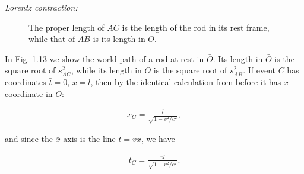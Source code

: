 \documentclass[12pt]{book}
\begin{document}
        \textit{Lorentz contraction:}
        \begin{figure}[h!]
        \centering
        \caption{The proper length of \( AC \) is the length of the rod in its rest frame, while that of \( AB \) is its length in \( O \).}
        \end{figure}

        In Fig. 1.13 we show the world path of a rod at rest in \( \bar{O} \). Its length in \( \bar{O} \) is the square root of \( s^2_{AC} \), while its length in \( O \) is the square root of \( s^2_{AB} \). If event \( C \) has coordinates \( \bar{t} = 0 \), \( \bar{x} = l \), then by the identical calculation from before it has \( x \) coordinate in \( O \):
        
        \begin{align}
        x_C = \frac{l}{\sqrt{1 - v^2/c^2}},
        \end{align}
        
        and since the \( \bar{x} \) axis is the line \( t = vx \), we have
        
        \begin{align}
        t_C = \frac{vl}{\sqrt{1 - v^2/c^2}}.
        \end{align}
        
\end{document}
